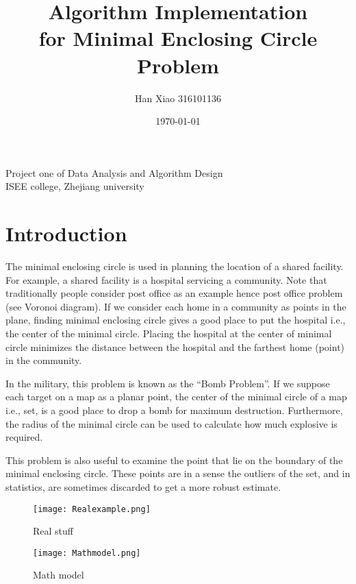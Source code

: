 \documentclass[a4paper, 12pt]{article}
\title{Algorithm Implementation \\ for Minimal Enclosing Circle Problem}
\author{Han Xiao 316101136}
\date{\today}
\begin{document}
\lstset{language=Matlab}%
\lstset{breaklines}%
\lstset{extendedchars=false}%

\maketitle
\begin{center}
Project one of Data Analysis and Algorithm Design %
\\[12pt]
ISEE college, Zhejiang university
\end{center}
\thispagestyle{empty}
\restoregeometry

\newpage
\tableofcontents
\listoffigures
\listofalgorithms
 


\newpage
\section{Introduction}
%
The minimal enclosing circle is used in planning the location of a shared facility. For example, a shared facility is a hospital servicing a community. Note that traditionally people consider post office as an example hence post office problem (see Voronoi diagram).  If we consider each home in a community as points in the plane, finding minimal enclosing circle gives a good place to put the hospital i.e., the center of the minimal circle. Placing the hospital at the center of minimal circle minimizes the distance between the hospital and the farthest home (point) in the community.

In the military, this problem is known as the “Bomb Problem”. If we suppose each target on a map as a planar point, the center of the minimal circle of a map i.e., set, is a good place to drop a bomb for maximum destruction. Furthermore, the radius of the minimal circle can be used to calculate how much explosive is required.


This problem is also useful to examine the point that lie on the boundary of the minimal enclosing circle. These points are in a sense the outliers of the set, and in statistics, are sometimes discarded to get a more robust estimate.

\begin{figure}[H]
\begin{minipage}[H]{0.5\linewidth}
\centering
\texttt{[image: Realexample.png]}
\caption{Real stuff}
\label{fig:side:a}
\end{minipage}%
\begin{minipage}[H]{0.5\linewidth}
\centering
\texttt{[image: Mathmodel.png]}
\caption{Math model}
\label{fig:side:b}
\end{minipage}
\end{figure}
\end{document}
